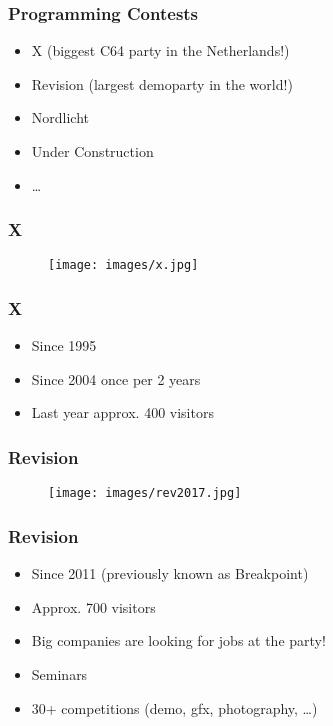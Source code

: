 \documentclass[aspectratio=43]{uva-inf-presentation}
\begin{document}
\begin{frame}
\frametitle{Programming Contests}

\begin{itemize}
\item X (biggest C64 party in the Netherlands!)
\item Revision (largest demoparty in the world!)
\item Nordlicht
\item Under Construction
\item \dots
\end{itemize}

\end{frame}


\begin{frame}
\frametitle{X}

\begin{figure}
\texttt{[image: images/x.jpg]}
\end{figure}

\end{frame}


\begin{frame}
\frametitle{X}

\begin{itemize}
\item Since 1995
\item Since 2004 once per 2 years
\item Last year approx. 400 visitors
\end{itemize}

\end{frame}


\begin{frame}
\frametitle{Revision}

\begin{figure}
\texttt{[image: images/rev2017.jpg]}
\end{figure}

\end{frame}


\begin{frame}
\frametitle{Revision}

\begin{itemize}
\item Since 2011 (previously known as Breakpoint)
\item Approx. 700 visitors
\item Big companies are looking for jobs at the party!
\item Seminars
\item 30+ competitions (demo, gfx, photography, \dots)
\end{itemize}

\end{frame}
\end{document}
